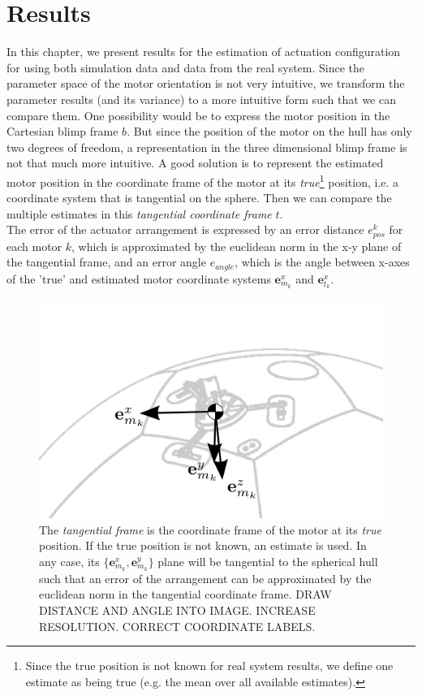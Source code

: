 \chapter{Results}
\label{chap:simulation_results}

In this chapter, we present results for the estimation of actuation configuration for using both simulation data and data from the real system.
Since the parameter space of the motor orientation is not very intuitive, we transform the parameter results (and its variance) to a more intuitive form such that we can compare them.
One possibility would be to express the motor position in the Cartesian blimp frame $b$.
But since the position of the motor on the hull has only two degrees of freedom, a representation in the three dimensional blimp frame is not that much more intuitive.
A good solution is to represent the estimated motor position in the coordinate frame of the motor at its \textit{true}\footnote{
Since the true position is not known for real system results, we define one estimate as being true (e.g. the mean over all available estimates).
}
position, i.e. a coordinate system that is tangential on the sphere.
Then we can compare the multiple estimates in this \textit{tangential coordinate frame} $t$.
\\
The error of the actuator arrangement is expressed by an error distance $e_{pos}^k$ for each motor $k$, which is approximated by the euclidean norm in the x-y plane of the tangential frame,
and an error angle $e_{angle}$, which is the angle between x-axes of the 'true' and estimated motor coordinate systems $\mathbf{e}_{m_k}^x$ and $\mathbf{e}_{t_k}^x$.

\begin{figure}[hbtp]
\centering
\includegraphics[scale=1]{images/tangential_frame.png}
\caption{The \textit{tangential frame} is the coordinate frame of the motor at its \textit{true} position. If the true position is not known, an estimate is used. In any case, its $\lbrace \mathbf{e}^x_{m_k} , \mathbf{e}^y_{m_k} \rbrace$ plane will be tangential to the spherical hull such that an error of the arrangement can be approximated by the euclidean norm in the tangential coordinate frame.
DRAW DISTANCE AND ANGLE INTO IMAGE. INCREASE RESOLUTION. CORRECT COORDINATE LABELS.}
\label{fig:tangential_frame}
\end{figure}

